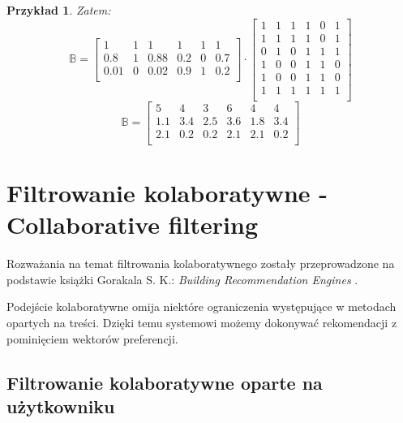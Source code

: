 \documentclass[12pt,a4paper]{report}
\newtheorem{przyklad}{Przykład}[chapter]
\begin{document}
\begin{przyklad}
Zatem:
$$
\mathbb{B} = \left[
        \begin{array}{cccccc}
         1 & 1 & 1 & 1 & 1 & 1 \\
         0.8 & 1 & 0.88 & 0.2 & 0 & 0.7 \\
         0.01 & 0 & 0.02 & 0.9 & 1 & 0.2 \\
         \end{array}
      \right] \cdot \left[
        \begin{array}{cccccc}
         1 & 1 & 1 & 1 & 0 & 1 \\
         1 & 1 & 1 & 1 & 0 & 1 \\
         0 & 1 & 0 & 1 & 1 & 1 \\
         1 & 0 & 0 & 1 & 1 & 0 \\
         1 & 0 & 0 & 1 & 1 & 0 \\
         1 & 1 & 1 & 1 & 1 & 1 \\
         \end{array}
      \right] $$
      $$ \mathbb{B} = \left[
        \begin{array}{cccccc}
         5 & 4 & 3 & 6 & 4 & 4 \\
         1.1 & 3.4 & 2.5 & 3.6 & 1.8 & 3.4 \\
         2.1 & 0.2 & 0.2 & 2.1 & 2.1 & 0.2 \\
         \end{array}
      \right]$$

\end{przyklad}


\section{Filtrowanie kolaboratywne - Collaborative filtering}
Rozważania na temat filtrowania kolaboratywnego zostały przeprowadzone na podstawie książki Gorakala S. K.: \textit{Building Recommendation Engines} {\citep[Sec 3]{bre}}.
\bigskip

Podejście kolaboratywne omija niektóre ograniczenia występujące w metodach opartych na treści. Dzięki temu systemowi możemy dokonywać rekomendacji z pominięciem wektorów preferencji. 

\subsection{Filtrowanie kolaboratywne oparte na użytkowniku}
\end{document}

